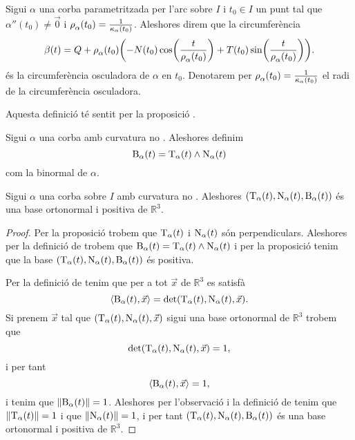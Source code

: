 \documentclass[../Apunts.tex]{subfiles}
\begin{document}
	\begin{definition}
		\label{def:circumferència osculadora}
		Sigui \(\alpha\) una corba parametritzada per l'arc sobre \(I\) i \(t_{0}\in I\) un punt tal que \(\alpha''(t_{0})\neq\vec{0}\) i \(\operatorname{\rho}_{\alpha}(t_{0})=\frac{1}{\operatorname{\kappa}_{\alpha}(t_{0})}\). Aleshores direm que la circumferència
		\[\beta(t)=Q+\radicircosculadora_{\alpha}(t_{0})\left(-N(t_{0})\cos\left(\frac{t}{\radicircosculadora_{\alpha}(t_{0})}\right)+T(t_{0})\sin\left(\frac{t}{\radicircosculadora_{\alpha}(t_{0})}\right)\right).\]
		és la circumferència osculadora de \(\alpha\) en \(t_{0}\). Denotarem per \(\operatorname{\rho}_{\alpha}(t_{0})=\frac{1}{\operatorname{\kappa}_{\alpha}(t_{0})}\) el radi de la circumferència osculadora.
		
		Aquesta definició té sentit per la proposició .
	\end{definition}
	\begin{definition}[Binormal]
		\label{def:binormal}
		Sigui \(\alpha\) una corba amb curvatura no \nulla{}. Aleshores definim
		\[\operatorname{B}_{\alpha}(t)=\operatorname{T}_{\alpha}(t)\mathbin{\wedge}\operatorname{N}_{\alpha}(t)\]
		com la binormal de \(\alpha\).
	\end{definition}
	\begin{proposition}
		\label{prop:triedre de Frenet}
		Sigui \(\alpha\) una corba sobre \(I\) amb curvatura no \nulla{}. Aleshores \((\operatorname{T}_{\alpha}(t),\operatorname{N}_{\alpha}(t),\operatorname{B}_{\alpha}(t))\) és una base ortonormal i positiva de \(\mathbb{R}^{3}\).
		\begin{proof}
			Per la proposició  trobem que \(\operatorname{T}_{\alpha}(t)\) i \(\operatorname{N}_{\alpha}(t)\) són perpendiculars. Aleshores per la definició de  trobem que \(\operatorname{B}_{\alpha}(t)=\operatorname{T}_{\alpha}(t)\mathbin{\wedge}\operatorname{N}_{\alpha}(t)\) i per la proposició  tenim que la base \((\operatorname{T}_{\alpha}(t),\operatorname{N}_{\alpha}(t),\operatorname{B}_{\alpha}(t))\) és positiva.
			
			Per la definició de  tenim que per a tot \(\vec{x}\) de \(\mathbb{R}^{3}\) es satisfà
			\[\prodesc{\binormal_{\alpha}(t)}{\vec{x}}=\det(\tangent_{\alpha}(t),\normal_{\alpha}(t),\vec{x}).\]
			Si prenem \(\vec{x}\) tal que \((\operatorname{T}_{\alpha}(t),\operatorname{N}_{\alpha}(t),\vec{x})\) sigui una base ortonormal de \(\mathbb{R}^{3}\) trobem que
			\[\det(\operatorname{T}_{\alpha}(t),\operatorname{N}_{\alpha}(t),\vec{x})=1,\]
			i per tant
			\[\prodesc{\binormal_{\alpha}(t)}{\vec{x}}=1,\]
			i tenim que \(\norm{\binormal_{\alpha}(t)}=1\). Aleshores per l'observació  i la definició de  tenim que \(\norm{\tangent_{\alpha}(t)}=1\) i que \(\norm{\normal_{\alpha}(t)}=1\), i per tant \((\operatorname{T}_{\alpha}(t),\operatorname{N}_{\alpha}(t),\operatorname{B}_{\alpha}(t))\) és una base ortonormal i positiva de \(\mathbb{R}^{3}\). %
		\end{proof}
	\end{proposition}
\end{document}
